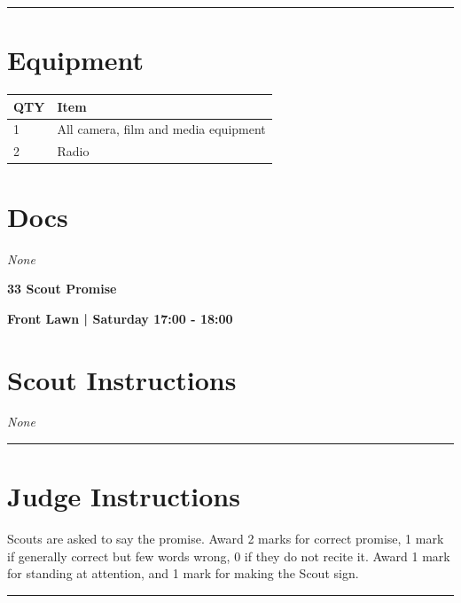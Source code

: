 \documentclass[10pt]{article}
\newcommand{\newtitle}[1]{\begin{center}{\Huge\bfseries #1 }\\ \vspace{5mm}\end{center}}
\newcommand{\newsubtitle}[1]{\begin{center}{\color{grey}\Large\bfseries #1 }\\ \vspace{5mm}\end{center}}
\begin{document}
			\vspace{0.5cm}
	\hrule
	\vspace{0.5cm}

	\begin{multicols}{2}

		\section*{\faWrench \: Equipment}

		
	\begin{center}
			\begin{tabular}{p{2cm}p{4cm}}


				\textbf{QTY} & \textbf{Item} \\\toprule
												1&All camera, film and media equipment\\\midrule
												2&Radio\\\midrule
								\end{tabular}

			\end{center}

		
		\vfill\null
		\columnbreak

			\section*{\faFile \: Docs}
		 	\textit{None}
	

		\vfill\null

		\end{multicols}



	\vspace{1cm}


	\clearpage
		\newtitle{33 Scout Promise }
	\newsubtitle{Front Lawn | Saturday 17:00 - 18:00}
		\setcounter{section}{32}
	\section*{Scout Instructions}
		\textit{None}
	
	\vspace{0.5cm}
	\hrule
	\vspace{0.5cm}

		\section*{Judge Instructions}
		Scouts are asked to say the promise. Award 2 marks for correct promise, 1 mark if generally correct but few words wrong, 0 if they do not recite it. Award 1 mark for standing at attention, and 1 mark for making the Scout sign.
\vspace{0.5cm}
	\hrule
	\vspace{0.5cm}
\end{document}

